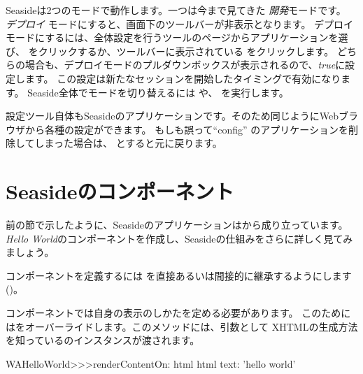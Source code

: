 \documentclass[a4paper,10pt,twoside]{book}
\begin{document}
Seasideは2つのモードで動作します。一つは今まで見てきた \emph{開発}モードです。 \emph{デプロイ} モードにすると、画面下のツールバーが非表示となります。
デプロイモードにするには、全体設定を行うツールのページからアプリケーションを選び、  をクリックするか、ツールバーに表示されている  をクリックします。
どちらの場合も、デプロイモードのプルダウンボックスが表示されるので、\emph{true}に設定します。
この設定は新たなセッションを開始したタイミングで有効になります。
Seaside全体でモードを切り替えるには や、
を実行します。

設定ツール自体もSeasideのアプリケーションです。そのため同じようにWebブラウザから各種の設定ができます。
もしも誤って``config'' のアプリケーションを削除してしまった場合は、
  とすると元に戻ります。

\section{Seasideのコンポーネント}


前の節で示したように、Seasideのアプリケーションは\emph{}から成り立っています。
\emph{Hello World}のコンポーネントを作成し、Seasideの仕組みをさらに詳しく見てみましょう。

コンポーネントを定義するには を直接あるいは間接的に継承するようにします()。


コンポーネントでは自身の表示のしかたを定める必要があります。
このためにはをオーバーライドします。このメソッドには、引数として XHTMLの生成方法を知っているのインスタンスが渡されます。

\begin{code}{}
WAHelloWorld>>>renderContentOn: html
	html text: 'hello world'
\end{code}
\end{document}
